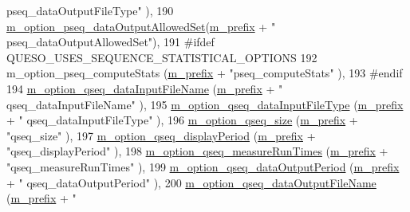 \begin{DoxyCode}
{      pseq\_dataOutputFileType"}  ),
190   \hyperlink{class_q_u_e_s_o_1_1_monte_carlo_s_g_options_a496b1325324965abbeffd3ef8b919975}{m\_option\_pseq\_dataOutputAllowedSet}(\hyperlink{class_q_u_e_s_o_1_1_monte_carlo_s_g_options_ac640fa60af7134d4113e9b7481a34f6c}{m\_prefix} + \textcolor{stringliteral}{"
      pseq\_dataOutputAllowedSet"}),
191 \textcolor{preprocessor}{#ifdef QUESO\_USES\_SEQUENCE\_STATISTICAL\_OPTIONS}
192 \textcolor{preprocessor}{}  m\_option\_pseq\_computeStats        (\hyperlink{class_q_u_e_s_o_1_1_monte_carlo_s_g_options_ac640fa60af7134d4113e9b7481a34f6c}{m\_prefix} + \textcolor{stringliteral}{"pseq\_computeStats"}        ),
193 \textcolor{preprocessor}{#endif}
194 \textcolor{preprocessor}{}  \hyperlink{class_q_u_e_s_o_1_1_monte_carlo_s_g_options_adfa1e97f82f761f277721e3002fa5be5}{m\_option\_qseq\_dataInputFileName}   (\hyperlink{class_q_u_e_s_o_1_1_monte_carlo_s_g_options_ac640fa60af7134d4113e9b7481a34f6c}{m\_prefix} + \textcolor{stringliteral}{"
      qseq\_dataInputFileName"}   ),
195   \hyperlink{class_q_u_e_s_o_1_1_monte_carlo_s_g_options_a93530ee50a7e47ad57b46ca6cf04a60c}{m\_option\_qseq\_dataInputFileType}   (\hyperlink{class_q_u_e_s_o_1_1_monte_carlo_s_g_options_ac640fa60af7134d4113e9b7481a34f6c}{m\_prefix} + \textcolor{stringliteral}{"
      qseq\_dataInputFileType"}   ),
196   \hyperlink{class_q_u_e_s_o_1_1_monte_carlo_s_g_options_ab720df7bb4ec0dbffd231de174d30423}{m\_option\_qseq\_size}                (\hyperlink{class_q_u_e_s_o_1_1_monte_carlo_s_g_options_ac640fa60af7134d4113e9b7481a34f6c}{m\_prefix} + \textcolor{stringliteral}{"qseq\_size"}                ),
197   \hyperlink{class_q_u_e_s_o_1_1_monte_carlo_s_g_options_a14d5adea03855e45e535cf10cf8ea3ae}{m\_option\_qseq\_displayPeriod}       (\hyperlink{class_q_u_e_s_o_1_1_monte_carlo_s_g_options_ac640fa60af7134d4113e9b7481a34f6c}{m\_prefix} + \textcolor{stringliteral}{"qseq\_displayPeriod"}    
         ),
198   \hyperlink{class_q_u_e_s_o_1_1_monte_carlo_s_g_options_a16456d0bcab4d4aca08b02f0ce123b07}{m\_option\_qseq\_measureRunTimes}     (\hyperlink{class_q_u_e_s_o_1_1_monte_carlo_s_g_options_ac640fa60af7134d4113e9b7481a34f6c}{m\_prefix} + \textcolor{stringliteral}{"qseq\_measureRunTimes"}
           ),
199   \hyperlink{class_q_u_e_s_o_1_1_monte_carlo_s_g_options_a604e3546503d8b7f9a8e0c48922b2ed7}{m\_option\_qseq\_dataOutputPeriod}    (\hyperlink{class_q_u_e_s_o_1_1_monte_carlo_s_g_options_ac640fa60af7134d4113e9b7481a34f6c}{m\_prefix} + \textcolor{stringliteral}{"
      qseq\_dataOutputPeriod"}    ),
200   \hyperlink{class_q_u_e_s_o_1_1_monte_carlo_s_g_options_a30620452f8188a0b4a0519bed24e64d1}{m\_option\_qseq\_dataOutputFileName}  (\hyperlink{class_q_u_e_s_o_1_1_monte_carlo_s_g_options_ac640fa60af7134d4113e9b7481a34f6c}{m\_prefix} + \textcolor{stringliteral}{"
}
\end{DoxyCode}

